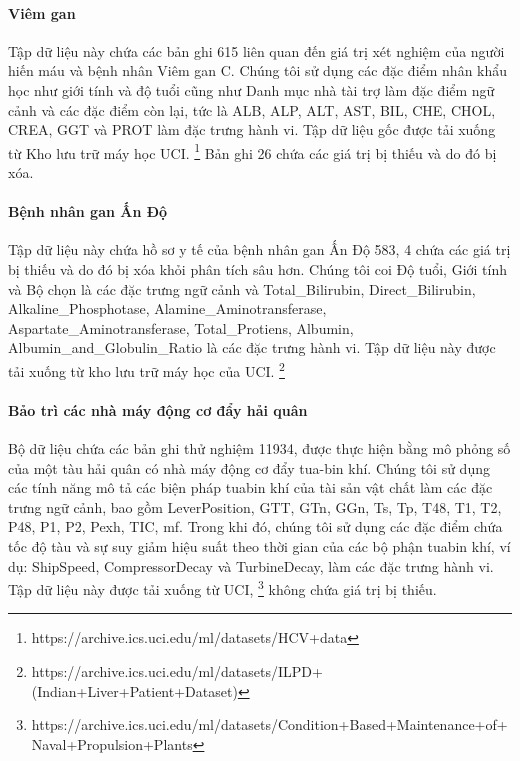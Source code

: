 \paragraph{Viêm gan}
Tập dữ liệu này chứa các bản ghi 615 liên quan đến giá trị xét nghiệm của người hiến máu và bệnh nhân Viêm gan C. Chúng tôi sử dụng các đặc điểm nhân khẩu học như giới tính và độ tuổi cũng như Danh mục nhà tài trợ làm đặc điểm ngữ cảnh và các đặc điểm còn lại, tức là ALB, ALP, ALT, AST, BIL, CHE, CHOL, CREA, GGT và PROT làm đặc trưng hành vi. Tập dữ liệu gốc được tải xuống từ Kho lưu trữ máy học UCI. \footnote{ https://archive.ics.uci.edu/ml/datasets/HCV+data} Bản ghi 26 chứa các giá trị bị thiếu và do đó bị xóa.\paragraph{Bệnh nhân gan Ấn Độ}
Tập dữ liệu này chứa hồ sơ y tế của bệnh nhân gan Ấn Độ 583, 4 chứa các giá trị bị thiếu và do đó bị xóa khỏi phân tích sâu hơn. Chúng tôi coi Độ tuổi, Giới tính và Bộ chọn là các đặc trưng ngữ cảnh và Total\_Bilirubin, Direct\_Bilirubin, Alkaline\_Phosphotase, Alamine\_Aminotransferase, Aspartate\_Aminotransferase, Total\_Protiens, Albumin, Albumin\_and\_Globulin\_Ratio là các đặc trưng hành vi. Tập dữ liệu này được tải xuống từ kho lưu trữ máy học của UCI. \footnote{https://archive.ics.uci.edu/ml/datasets/ILPD+(Indian+Liver+Patient+Dataset)}

\paragraph{Bảo trì các nhà máy động cơ đẩy hải quân } Bộ dữ liệu chứa các bản ghi thử nghiệm 11934, được thực hiện bằng mô phỏng số của một tàu hải quân có nhà máy động cơ đẩy tua-bin khí. Chúng tôi sử dụng các tính năng mô tả các biện pháp tuabin khí của tài sản vật chất làm các đặc trưng ngữ cảnh, bao gồm LeverPosition, GTT, GTn, GGn, Ts, Tp, T48, T1, T2, P48, P1, P2, Pexh, TIC, mf. Trong khi đó, chúng tôi sử dụng các đặc điểm chứa tốc độ tàu và sự suy giảm hiệu suất theo thời gian của các bộ phận tuabin khí, ví dụ: ShipSpeed, CompressorDecay và TurbineDecay, làm các đặc trưng hành vi. Tập dữ liệu này được tải xuống từ UCI, \footnote{https://archive.ics.uci.edu/ml/datasets/Condition+Based+Maintenance+of+Naval+Propulsion+Plants} không chứa giá trị bị thiếu.

